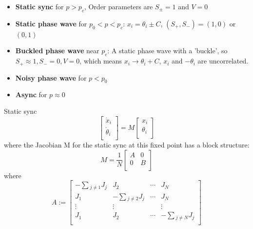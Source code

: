 \documentclass[10pt,aspectratio=43,mathserif,table]{beamer}
\begin{document}
\begin{frame}
    \begin{itemize}
        \item \textbf{Static sync} for $p > p_c$, Order parameters are $S_\pm = 1$ and $V = 0$
        \item \textbf{Static phase wave} for $p_0 < p < p_c$: $x_i = \theta_i \pm C$, $(S_+, S_-) = (1, 0)$ or $(0, 1)$
        \item \textbf{Buckled phase wave} near $p_c$:  A static phase wave
        with a 'buckle', so $S_+ \approx 1, S_-=0, V=0$, which means $x_i \rightarrow \theta_i + C$, $x_i$ and $-\theta_i$ are uncorrelated.
        \item \textbf{Noisy phase wave} for $p < p_0$
        \item \textbf{Async} for $p \approx 0$
    \end{itemize}
\end{frame}

\begin{frame}{Static sync}
    $$
    \left[ \begin{array}{c}
        \dot{x}_i\\
        \dot{\theta}_i\\
    \end{array} \right] =M\left[ \begin{array}{c}
        x_i\\
        \theta _i\\
    \end{array} \right] 
    $$
    where the Jacobian M for the static sync at this fixed point has a block structure:
    $$
    M=\frac{1}{N}\left[ \begin{matrix}
        A&		0\\
        0&		B\\
    \end{matrix} \right] 
    $$
    where 
    $$
    A:=\left[ \begin{matrix}
        -\sum{_{j\ne 1}J_j}&		J_2&		\cdots&		J_N\\
        J_1&		-\sum{_{j\ne 2}J_j}&		\cdots&		J_N\\
        \vdots&		\vdots&		\,\,&		\vdots\\
        J_1&		J_2&		\cdots&		-\sum{_{j\ne N}J_j}\\
    \end{matrix} \right] 
    $$
    
\end{frame}
\end{document}
